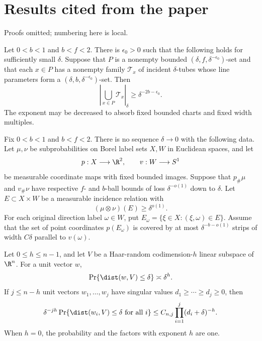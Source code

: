 \documentclass[11pt,reqno]{amsart}
\begin{document}
\section*{Results cited from the paper}
Proofs omitted; numbering here is local.

\begin{theorem}
\label{ang:furstenberg}
Let $0<b<1$ and $b<f<2$. There is $\epsilon_0>0$ such that the
following holds for sufficiently small $\delta$. Suppose that $P$ is
a nonempty bounded $(\delta,f,\delta^{-\epsilon_0})$-set and that
each $x\in P$ has a nonempty family $\mathcal T_x$ of incident
$\delta$-tubes whose line parameters form a
$(\delta,b,\delta^{-\epsilon_0})$-set. Then
\[
 \left|\bigcup_{x\in P}\mathcal T_x\right|_\delta
       \ge\delta^{-2b-\epsilon_0}.
\]
The exponent may be decreased to absorb fixed bounded charts and fixed
width multiples.
\end{theorem}

\begin{lemma}
\label{ang:planar-measures}
Fix $0<b<1$ and $b<f<2$. There is no sequence $\delta\to0$ with the
following data. Let $\mu,\nu$ be subprobabilities on Borel label sets
$X,W$ in Euclidean spaces, and let
\[
 p:X\longrightarrow\R^2,\qquad v:W\longrightarrow S^1
\]
be measurable coordinate maps with fixed bounded images. Suppose that
$p_\#\mu$ and $v_\#\nu$ have respective $f$- and $b$-ball bounds
of loss $\delta^{-o(1)}$ down to $\delta$. Let $E\subset X\times W$ be a measurable
incidence relation with
\[
 (\mu\otimes\nu)(E)\ge\delta^{o(1)}.
\]
For each original direction label $\omega\in W$, put
$E_\omega=\{\xi\in X:(\xi,\omega)\in E\}$. Assume that the set of
point coordinates $p(E_\omega)$ is covered by at most
$\delta^{-b-o(1)}$ strips of width $C\delta$ parallel to $v(\omega)$.
\end{lemma}

\begin{lemma}\label{ang:haar}
Let $0\le h\le n-1$, and let $V$ be a Haar-random codimension-$h$
linear subspace of $\R^n$.
For a unit vector $w$,
\[
 \Pr\{\dist(w,V)\le\delta\}\asymp\delta^h.
\]
If $j\le n-h$ unit vectors $w_1,\ldots,w_j$ have singular values
$d_1\ge\cdots\ge d_j\ge0$, then
\begin{equation}\label{ang:haar-multiple}
 \delta^{-jh}\Pr\{\dist(w_i,V)\le\delta\text{ for all }i\}
       \le C_{n,j}\prod_{i=1}^j(d_i+\delta)^{-h}.
\end{equation}
When $h=0$, the probability and the factors with exponent $h$ are one.
\end{lemma}
\end{document}
